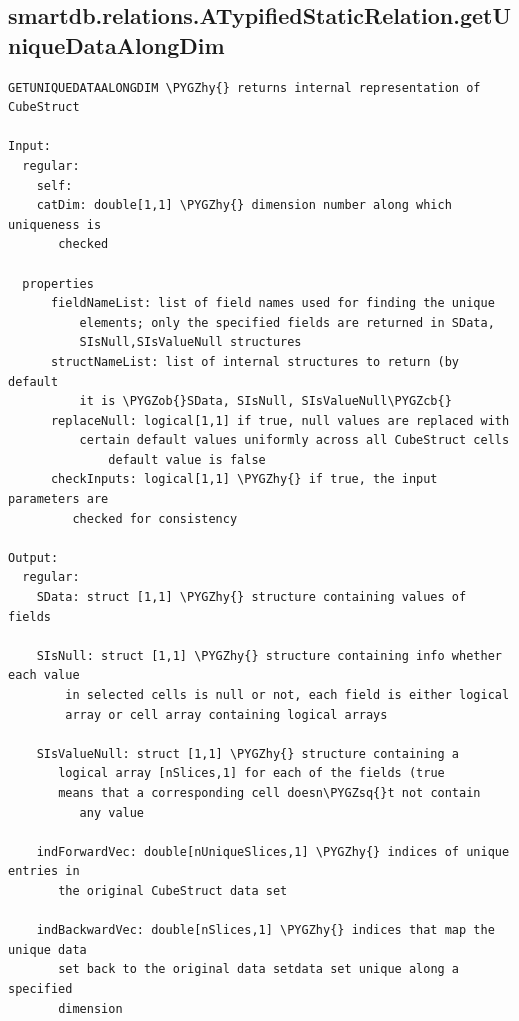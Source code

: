 \documentclass[letterpaper,10pt,english]{sphinxmanual}
\def\PYGZob{\char`\{}
\def\PYGZcb{\char`\}}
\def\PYGZhy{\char`\-}
\def\PYGZsq{\char`\'}
\begin{document}
\subsection{smartdb.relations.ATypifiedStaticRelation.getUniqueDataAlongDim}
\label{chap_functions:smartdb-relations-atypifiedstaticrelation-getuniquedataalongdim}
\begin{Verbatim}[commandchars=\\\{\}]
GETUNIQUEDATAALONGDIM \PYGZhy{} returns internal representation of CubeStruct

Input:
  regular:
    self:
    catDim: double[1,1] \PYGZhy{} dimension number along which uniqueness is
       checked

  properties
      fieldNameList: list of field names used for finding the unique
          elements; only the specified fields are returned in SData,
          SIsNull,SIsValueNull structures
      structNameList: list of internal structures to return (by default
          it is \PYGZob{}SData, SIsNull, SIsValueNull\PYGZcb{}
      replaceNull: logical[1,1] if true, null values are replaced with
          certain default values uniformly across all CubeStruct cells
              default value is false
      checkInputs: logical[1,1] \PYGZhy{} if true, the input parameters are
         checked for consistency

Output:
  regular:
    SData: struct [1,1] \PYGZhy{} structure containing values of fields

    SIsNull: struct [1,1] \PYGZhy{} structure containing info whether each value
        in selected cells is null or not, each field is either logical
        array or cell array containing logical arrays

    SIsValueNull: struct [1,1] \PYGZhy{} structure containing a
       logical array [nSlices,1] for each of the fields (true
       means that a corresponding cell doesn\PYGZsq{}t not contain
          any value

    indForwardVec: double[nUniqueSlices,1] \PYGZhy{} indices of unique entries in
       the original CubeStruct data set

    indBackwardVec: double[nSlices,1] \PYGZhy{} indices that map the unique data
       set back to the original data setdata set unique along a specified
       dimension
\end{Verbatim}
\end{document}
